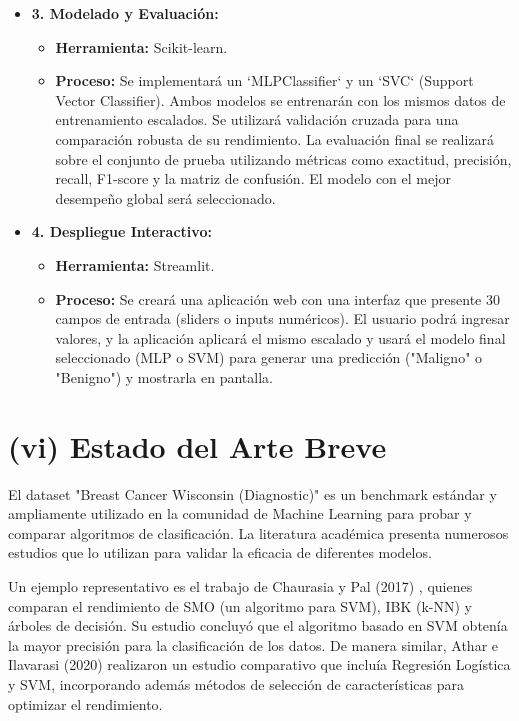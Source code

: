 \documentclass[12pt]{src/formato_utem}
\begin{document}
\begin{itemize}
    \item \textbf{3. Modelado y Evaluación:}
    \begin{itemize}
        \item \textbf{Herramienta:} Scikit-learn.
        \item \textbf{Proceso:} Se implementará un `MLPClassifier` y un `SVC` (Support Vector Classifier). Ambos modelos se entrenarán con los mismos datos de entrenamiento escalados. Se utilizará validación cruzada para una comparación robusta de su rendimiento. La evaluación final se realizará sobre el conjunto de prueba utilizando métricas como exactitud, precisión, recall, F1-score y la matriz de confusión. El modelo con el mejor desempeño global será seleccionado.
    \end{itemize}

    \item \textbf{4. Despliegue Interactivo:}
    \begin{itemize}
        \item \textbf{Herramienta:} Streamlit.
        \item \textbf{Proceso:} Se creará una aplicación web con una interfaz que presente 30 campos de entrada (sliders o inputs numéricos). El usuario podrá ingresar valores, y la aplicación aplicará el mismo escalado y usará el modelo final seleccionado (MLP o SVM) para generar una predicción ("Maligno" o "Benigno") y mostrarla en pantalla.
    \end{itemize}
\end{itemize}
\newpage
\section*{(vi) Estado del Arte Breve}
El dataset "Breast Cancer Wisconsin (Diagnostic)" es un benchmark estándar y ampliamente utilizado en la comunidad de Machine Learning para probar y comparar algoritmos de clasificación. La literatura académica presenta numerosos estudios que lo utilizan para validar la eficacia de diferentes modelos.

Un ejemplo representativo es el trabajo de Chaurasia y Pal (2017) \cite{chaurasia2017}, quienes comparan el rendimiento de SMO (un algoritmo para SVM), IBK (k-NN) y árboles de decisión. Su estudio concluyó que el algoritmo basado en SVM obtenía la mayor precisión para la clasificación de los datos. De manera similar, Athar e Ilavarasi (2020) \cite{athar2020} realizaron un estudio comparativo que incluía Regresión Logística y SVM, incorporando además métodos de selección de características para optimizar el rendimiento.
\end{document}
